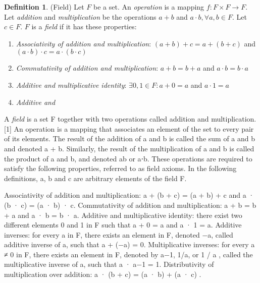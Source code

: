 \documentclass[9pt, twocolumn]{extarticle}
\theoremstyle{definition}
\newtheorem{definition}{Definition}
\begin{document}
  \begin{definition}{(Field)} 
    Let $ F $ be a set. An \emph{operation} is a mapping $ f:F\times F \rightarrow F$. Let \emph{addition} and \emph{multiplication} be the operations $ a + b$ and $ a\cdot b, \forall a,b\in F$. Let $ c \in F $. $ F $ is a \emph{field} if it has these properties:
    \begin{enumerate}[label=(\roman*)]
      \item \emph{Associativity of addition and multiplication}: $ (a+b)+c=a+(b+c) $ and $ (a\cdot b)\cdot c=a\cdot (b\cdot c) $
      \item \emph{Commutativity of addition and multiplication}: $ a+b=b+a $ and $ a\cdot b=b\cdot a $
      \item \emph{Additive and multiplicative identity}: $ \exists 0, 1\in F: a+0=a $ and $ a\cdot 1=a $
      \item \emph{Additive and}
      
    \end{enumerate}
    
    A \emph{field} is a set F together with two operations called addition and multiplication.[1] An operation is a mapping that associates an element of the set to every pair of its elements. The result of the addition of a and b is called the sum of a and b and denoted a + b. Similarly, the result of the multiplication of a and b is called the product of a and b, and denoted ab or a⋅b. These operations are required to satisfy the following properties, referred to as field axioms. In the following definitions, a, b and c are arbitrary elements of the field F.
    
    Associativity of addition and multiplication: a + (b + c) = (a + b) + c and a · (b · c) = (a · b) · c.
    Commutativity of addition and multiplication: a + b = b + a and a · b = b · a.
    Additive and multiplicative identity: there exist two different elements 0 and 1 in F such that a + 0 = a and a · 1 = a.
    Additive inverses: for every a in F, there exists an element in F, denoted −a, called additive inverse of a, such that a + (−a) = 0.
    Multiplicative inverses: for every a ≠ 0 in F, there exists an element in F, denoted by a−1, 1/a, or 
    1
    /
    a
    , called the multiplicative inverse of a, such that a · a−1 = 1.
    Distributivity of multiplication over addition: a · (b + c) = (a · b) + (a · c) .
    
  \end{definition}
\end{document}

